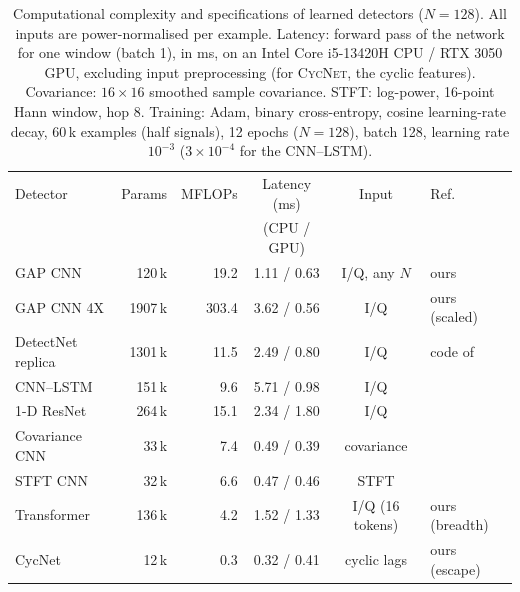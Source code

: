\begin{table}[t]
\centering
\caption{Computational complexity and specifications of learned detectors ($N=128$). All inputs are power-normalised per example. Latency: forward pass of the network for one window (batch 1), in ms, on an Intel Core i5-13420H CPU / RTX 3050 GPU, excluding input preprocessing (for \textsc{CycNet}, the cyclic features). Covariance: $16\times16$ smoothed sample covariance. STFT: log-power, 16-point Hann window, hop 8. Training: Adam, binary cross-entropy, cosine learning-rate decay, 60\,k examples (half signals), 12 epochs ($N=128$), batch 128, learning rate $10^{-3}$ ($3\times10^{-4}$ for the CNN--LSTM).}
\label{tab:impl}
\scriptsize
\setlength{\tabcolsep}{1.6pt}
\begin{tabular}{lrrccl}
\toprule
Detector & Params & MFLOPs & Latency (ms) & Input & Ref. \\
 & & & (CPU / GPU) & & \\
\midrule
GAP CNN & 120\,k & 19.2 & 1.11 / 0.63 & I/Q, any $N$ & ours \\
GAP CNN 4X & 1907\,k & 303.4 & 3.62 / 0.56 & I/Q & ours (scaled) \\
DetectNet replica & 1301\,k & 11.5 & 2.49 / 0.80 & I/Q & code of~\cite{gao2019deep} \\
CNN--LSTM & 151\,k & 9.6 & 5.71 / 0.98 & I/Q & \cite{gao2019deep} \\
1-D ResNet & 264\,k & 15.1 & 2.34 / 1.80 & I/Q & \cite{zheng2020spectrum} \\
Covariance CNN & 33\,k & 7.4 & 0.49 / 0.39 & covariance & \cite{liu2019cmcnn} \\
STFT CNN & 32\,k & 6.6 & 0.47 / 0.46 & STFT & \cite{chen2021stft} \\
Transformer & 136\,k & 4.2 & 1.52 / 1.33 & I/Q (16 tokens) & ours (breadth) \\
CycNet & 12\,k & 0.3 & 0.32 / 0.41 & cyclic lags & ours (escape) \\
\bottomrule
\end{tabular}
\end{table}
